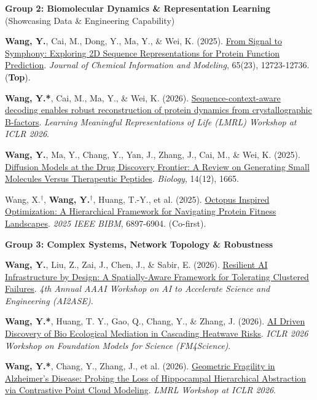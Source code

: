 \documentclass[10pt]{article}
\begin{document}
	\vspace{4pt}
	\textbf{Group 2: Biomolecular Dynamics \& Representation Learning} (Showcasing Data \& Engineering Capability)
	\begin{enumerate}[noitemsep, topsep=2pt, partopsep=0pt, parsep=0pt, leftmargin=*, label={[\arabic*]}, resume]
		\item \textbf{Wang, Y.}, Cai, M., Dong, Y., Ma, Y., \& Wei, K. (2025). \href{https://pubs.acs.org/doi/abs/10.1021/acs.jcim.5c01768}{From Signal to Symphony: Exploring 2D Sequence Representations for Protein Function Prediction}. \textit{Journal of Chemical Information and Modeling}, 65(23), 12723-12736. (\textbf{Top}).
		\item \textbf{Wang, Y.*}, Cai, M., Ma, Y., \& Wei, K. (2026). \href{https://openreview.net/forum?id=rTO3JOgC3a}{Sequence-context-aware decoding enables robust reconstruction of protein dynamics from crystallographic B-factors}. \textit{Learning Meaningful Representations of Life (LMRL) Workshop at ICLR 2026}.
		\item \textbf{Wang, Y.}, Ma, Y., Chang, Y., Yan, J., Zhang, J., Cai, M., \& Wei, K. (2025). \href{https://www.mdpi.com/2079-7737/14/12/1665}{Diffusion Models at the Drug Discovery Frontier: A Review on Generating Small Molecules Versus Therapeutic Peptides}. \textit{Biology}, 14(12), 1665.
		\item Wang, X.$^\dagger$, \textbf{Wang, Y.}$^\dagger$, Huang, T.-Y., et al. (2025). \href{https://ieeexplore.ieee.org/abstract/document/11356718/}{Octopus Inspired Optimization: A Hierarchical Framework for Navigating Protein Fitness Landscapes}. \textit{2025 IEEE BIBM}, 6897-6904. (Co-first).
	\end{enumerate}
	
	\vspace{4pt}
	\textbf{Group 3: Complex Systems, Network Topology \& Robustness}
	\begin{enumerate}[noitemsep, topsep=2pt, partopsep=0pt, parsep=0pt, leftmargin=*, label={[\arabic*]}, resume]
		\item \textbf{Wang, Y.}, Liu, Z., Zai, J., Chen, J., \& Sabir, E. (2026). \href{https://ai-2-ase.github.io/papers/CameraReadys\%203-41/24/CameraReady/anonymous-submission-latex-2026.pdf}{Resilient AI Infrastructure by Design: A Spatially-Aware Framework for Tolerating Clustered Failures}. \textit{4th Annual AAAI Workshop on AI to Accelerate Science and Engineering (AI2ASE)}.
		\item \textbf{Wang, Y.*}, Huang, T. Y., Gao, Q., Chang, Y., \& Zhang, J. (2026). \href{https://openreview.net/forum?noteId=rGV8EdrVXE}{AI Driven Discovery of Bio Ecological Mediation in Cascading Heatwave Risks}. \textit{ICLR 2026 Workshop on Foundation Models for Science (FM4Science)}. 
		\item \textbf{Wang, Y.*}, Chang, Y., Zhang, J., et al. (2026). \href{https://openreview.net/forum?id=1x6qbeYHQG}{Geometric Fragility in Alzheimer's Disease: Probing the Loss of Hippocampal Hierarchical Abstraction via Contrastive Point Cloud Modeling}. \textit{LMRL Workshop at ICLR 2026}.
	\end{enumerate}
	
\end{document}

